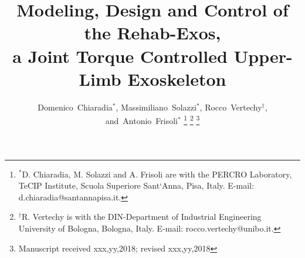 \documentclass[journal]{IEEEtran}
\begin{document}
%
\title{ Modeling, Design and Control of the Rehab-Exos,	 \\ a Joint Torque Controlled Upper-Limb Exoskeleton}
%
%
%

\author{Domenico~Chiaradia$^*$,
	Massimiliano~Solazzi$^*$,
	Rocco~Vertechy$^\dagger$,
	and~Antonio~Frisoli$^*$%
	\thanks{$^*$D. Chiaradia, M. Solazzi and A. Frisoli are  with the PERCRO Laboratory, TeCIP Institute, Scuola Superiore Sant`Anna, Pisa, Italy.  E-mail: d.chiaradia@santannapisa.it.}%
	\thanks{$^\dagger$R. Vertechy is with the DIN-Department of Industrial Engineering University of Bologna, Bologna, Italy. E-mail: rocco.vertechy@unibo.it.}%
	\thanks{Manuscript received xxx,yy,2018; revised xxx,yy,2018}}




% 
%
\end{document}
